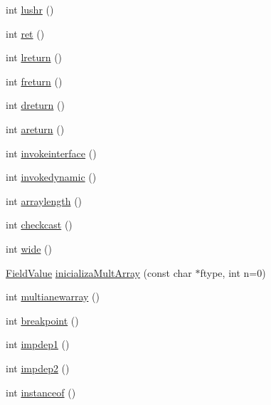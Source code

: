 \begin{DoxyCompactItemize}
\item 
int \hyperlink{classInterpretador_a35a099615e2a33cf16ce8236752259a7}{lushr} ()
\item 
int \hyperlink{classInterpretador_a8c2bb180f6a07f53a94fa88c9c3a0bec}{ret} ()
\item 
int \hyperlink{classInterpretador_a70f983db5eb1e67d1efcfb8b6c687f2f}{lreturn} ()
\item 
int \hyperlink{classInterpretador_af786a4428d01c07e74bfe4d9e0b4f759}{freturn} ()
\item 
int \hyperlink{classInterpretador_a250386e8b017352f042efb000966d2da}{dreturn} ()
\item 
int \hyperlink{classInterpretador_a9b478f66927891f1fdd43c40ed0ebf29}{areturn} ()
\item 
int \hyperlink{classInterpretador_a6d67982fb76ae93b2a45e75c21e2bd48}{invokeinterface} ()
\item 
int \hyperlink{classInterpretador_aa38a2df00d49291d498ffce261ad2173}{invokedynamic} ()
\item 
int \hyperlink{classInterpretador_a10a6668800bcd17f2891e63ac9375632}{arraylength} ()
\item 
int \hyperlink{classInterpretador_ad363da9cb60480ece0ca13f5594ff08e}{checkcast} ()
\item 
int \hyperlink{classInterpretador_a4ea842f9ce6c2a4235ad003f5715bef3}{wide} ()
\item 
\hyperlink{classFieldValue}{Field\+Value} \hyperlink{classInterpretador_a6a27fb90e5f1dd7a013e31738071d08e}{inicializa\+Mult\+Array} (const char $\ast$ftype, int n=0)
\item 
int \hyperlink{classInterpretador_a445404647231755ca07e3d75ecb6c031}{multianewarray} ()
\item 
int \hyperlink{classInterpretador_a10cf9ccb141aa5384ee84941f349fb20}{breakpoint} ()
\item 
int \hyperlink{classInterpretador_a8a5faaf2ba04843afb1020e0e1ee74ff}{impdep1} ()
\item 
int \hyperlink{classInterpretador_a345e1395af380d83cd513b561ba773a2}{impdep2} ()
\item 
int \hyperlink{classInterpretador_affe5cbf7a47e9113cb02b58df54f8069}{instanceof} ()
\end{DoxyCompactItemize}
